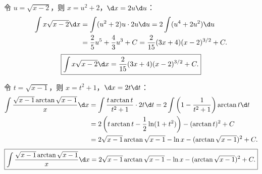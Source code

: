 \begin{solution}

    令 $u = \sqrt{x - 2}$，则 $x = u^2 + 2$，$\d x = 2u \d u$：
    \begin{equation}
        \begin{aligned}
            \int x\sqrt{x - 2} \d x & = \int (u^2 + 2) u \cdot 2u \d u = 2\int (u^4 + 2u^2) \d u                     \\
                                    & = \frac{2}{5}u^5 + \frac{4}{3}u^3 + C = \frac{2}{15}(3x + 4)(x - 2)^{3/2} + C.
        \end{aligned}
    \end{equation}
    \begin{equation}
        \boxed{\int x\sqrt{x - 2} \d x = \frac{2}{15}(3x + 4)(x - 2)^{3/2} + C.}
    \end{equation}


    令 $t = \sqrt{x - 1}$，则 $x = t^2 + 1$，$\d x = 2t \d t$：
    \begin{equation}
        \begin{aligned}
            \int \frac{\sqrt{x - 1} \arctan \sqrt{x - 1}}{x} \d x & = \int \frac{t \arctan t}{t^2 + 1} \cdot 2t \d t = 2\int \left( 1 - \frac{1}{t^2 + 1} \right)\arctan t \d t \\
                                                                  & = 2\left( t\arctan t - \frac{1}{2}\ln(1 + t^2) \right) - (\arctan t)^2 + C                                  \\
                                                                  & = 2\sqrt{x - 1}\arctan\sqrt{x - 1} - \ln x - (\arctan\sqrt{x - 1})^2 + C.
        \end{aligned}
    \end{equation}
    \begin{equation}
        \boxed{\int \frac{\sqrt{x - 1} \arctan \sqrt{x - 1}}{x} \d x = 2\sqrt{x - 1}\arctan\sqrt{x - 1} - \ln x - (\arctan\sqrt{x - 1})^2 + C.}
    \end{equation}



\end{solution}
